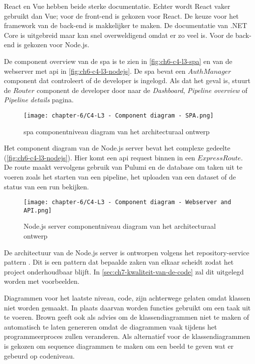React en Vue hebben beide sterke documentatie. Echter wordt React vaker gebruikt dan Vue; voor de front-end is gekozen voor React. De keuze voor het framework van de back-end is makkelijker te maken. De documentatie van .NET Core is uitgebreid maar kan snel overweldigend omdat er zo veel is. Voor de back-end is gekozen voor Node.js.

De component overview van de \acrshort{spa} is te zien in \autoref{fig:ch6-c4-l3-spa} en van de webserver met \acrshort{api} in \autoref{fig:ch6-c4-l3-nodejs}. De \acrshort{spa} bevat een \(AuthManager\) component dat controleert of de developer is ingelogd. Als dat het geval is, stuurt de \(Router\) component de developer door naar de \textit{Dashboard}, \textit{Pipeline overview} of \textit{Pipeline details} pagina.

\newpage

\begin{figure}[hbt!]
  \centering
  \texttt{[image: chapter-6/C4-L3 - Component diagram - SPA.png]}
  \caption{\Acrfull{spa} componentniveau diagram van het architecturaal ontwerp}
  \label{fig:ch6-c4-l3-spa}
\end{figure}

Het component diagram van de Node.js server bevat het complexe gedeelte (\autoref{fig:ch6-c4-l3-nodejs}). Hier komt een \acrshort{api} request binnen in een \(Express Route\). De route maakt vervolgens gebruik van Pulumi en de database om taken uit te voeren zoals het starten van een pipeline, het uploaden van een dataset of de status van een run bekijken.

\newpage

\begin{figure}[hbt!]
  \centering
  \texttt{[image: chapter-6/C4-L3 - Component diagram - Webserver and API.png]}
  \caption{Node.js server componentniveau diagram van het architecturaal ontwerp}
  \label{fig:ch6-c4-l3-nodejs}
\end{figure}

De architectuur van de Node.js server is ontworpen volgens het repository-service pattern \cite{repository-service-pattern}. Dit is een pattern dat bepaalde zaken van elkaar scheidt zodat het project onderhoudbaar blijft. In \autoref{sec:ch7-kwaliteit-van-de-code} zal dit uitgelegd worden met voorbeelden.

Diagrammen voor het laatste niveau, code, zijn achterwege gelaten omdat klassen niet worden gemaakt. In plaats daarvan worden functies gebruikt om een taak uit te voeren. Brown geeft ook als advies om de klassendiagrammen niet te maken of automatisch te laten genereren \cite{c4-model-faq} omdat de diagrammen vaak tijdens het programmeerproces zullen veranderen. Als alternatief voor de klassendiagrammen is gekozen om sequence diagrammen te maken om een beeld te geven wat er gebeurd op codeniveau.

